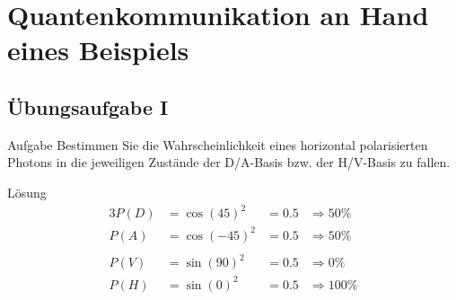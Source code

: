 \section{Quantenkommunikation an Hand eines Beispiels}
\begin{frame}[allowframebreaks]
	
\end{frame}

\subsection{{\"U}bungsaufgabe I}
\begin{frame}[allowframebreaks]
	\begin{block}{Aufgabe}
		Bestimmen Sie die Wahrscheinlichkeit eines horizontal polarisierten Photons in die jeweiligen Zust{\"a}nde der D/A-Basis bzw. der H/V-Basis zu fallen.
	\end{block}
\end{frame}
\begin{frame}[allowframebreaks]
	\begin{block}{L{\"o}sung}
		\begin{alignat*}{3}
			P(D) &= \cos(45)^2 &= 0.5 &\Rightarrow 50\% \\
			P(A) &= \cos(-45)^2 &= 0.5 &\Rightarrow 50\% \\
			\\
			P(V) &= \sin(90)^2 &= 0.5 &\Rightarrow 0\% \\
			P(H) &= \sin(0)^2 &= 0.5 &\Rightarrow 100\%
		\end{alignat*}
	\end{block}
\end{frame}

